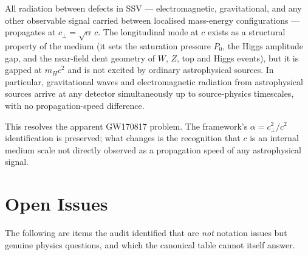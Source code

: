 \documentclass[11pt,a4paper]{article}
\begin{document}
\begin{decisionbox}
All radiation between defects in SSV --- electromagnetic, gravitational,
and any other observable signal carried between localised mass-energy
configurations --- propagates at $c_\perp = \sqrt{\alpha}\,c$.  The
longitudinal mode at $c$ exists as a structural property of the
medium (it sets the saturation pressure $P_0$, the Higgs amplitude
gap, and the near-field dent geometry of $W$, $Z$, top and Higgs
events), but it is gapped at $m_H c^2$ and is not excited by ordinary
astrophysical sources.  In particular, gravitational waves and
electromagnetic radiation from astrophysical sources arrive at any
detector simultaneously up to source-physics timescales, with no
propagation-speed difference.

This resolves the apparent GW170817 problem.  The framework's
$\alpha = c_\perp^2/c^2$ identification is preserved; what changes is
the recognition that $c$ is an internal medium scale not directly
observed as a propagation speed of any astrophysical signal.
\end{decisionbox}

\section{Open Issues}

The following are items the audit identified that are \emph{not} notation
issues but genuine physics questions, and which the canonical table cannot
itself answer.
\end{document}
